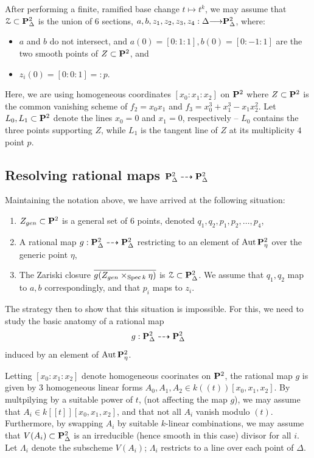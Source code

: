 \documentclass[12pt,reqno]{amsart}
\renewcommand{\k}{k}
\renewcommand{\to}{{\longrightarrow}}
\numberwithin{equation}{section}
\begin{document}
After performing a finite, ramified base change $t \mapsto t^{k}$, we
may assume that $\mathcal{Z} \subset \P^{2}_{\Delta}$ is the union of
$6$ sections,
$a, b, z_{1}, z_{2}, z_{3}, z_{4}: \Delta \to \P^{2}_{\Delta}$, where:
\begin{itemize}
\item $a$ and $b$ do not intersect, and
  $a(0) = [0:1:1], b(0) = [0:-1:1]$ are the two smooth points of
  $Z \subset \P^{2}$, and
\item $z_{i}(0) =[0:0:1] =: p$.
\end{itemize}
Here, we are using homogeneous coordinates $[x_0 :x_1 : x_2]$ on
$\P^{2}$ where $Z \subset \P^{2}$ is the common vanishing scheme of
$f_{2} = x_0 x_1$ and $f_3 = x_0^3+x_1^3-x_1x_2^2$.  Let
$L_{0}, L_{1} \subset \P^{2}$ denote the lines $x_0 = 0$ and $x_1=0$,
respectively -- $L_0$ contains the three points supporting $Z$, while
$L_1$ is the tangent line of $Z$ at its multiplicity $4$ point $p$.


\subsection{Resolving rational maps $\P^{2}_{\Delta} \dashrightarrow \P^{2}_{\Delta}$}
\label{sec:resolv-rati-maps}

Maintaining the notation above, we have arrived at the following
situation:
\begin{enumerate}
\item $Z_{gen} \subset \P^{2}$ is a general set of $6$ points, denoted $q_{1}, q_{2}, p_{1}, p_{2}, \dots, p_{4}$,\\
\item A rational map
  $g : \P^{2}_{\Delta} \dashrightarrow \P^{2}_{\Delta}$ restricting to
  an element of $\Aut \P^{2}_{\eta}$ over the generic point $\eta$, \\
\item The Zariski closure
  $\overline{g(Z_{gen} \times_{\spec \k} \eta)}$ is
  $\mathcal{Z} \subset \P^{2}_{\Delta}$.  We assume that
  $q_{1}, q_{2}$ map to $a,b$ correspondingly, and that $p_{i}$ maps
  to $z_{i}$.
\end{enumerate}

The strategy then to show that this situation is impossible.  For
this, we need to study the basic anatomy of a rational map
\[g: \P^{2}_{\Delta} \dashrightarrow \P^{2}_{\Delta} \] induced by an
element of $\Aut \P^{2}_{\eta}$.

Letting $[x_0 : x_1 : x_2]$ denote homogeneous coorinates on $\P^{2}$,
the rational map $g$ is given by $3$ homogeneous linear forms
$A_0, A_1, A_2 \in \k(\!(t)\!)[x_0,x_{1},x_{2}]$.  By multpilying by a
suitable power of $t$, (not affecting the map $g$), we may assume that
$A_{i} \in \k[\![t]\!][x_0, x_1, x_2]$, and that not all $A_i$ vanish
modulo $(t)$.  Furthermore, by swapping $A_{i}$ by suitable
$\k$-linear combinations, we may assume that
$V(A_{i}) \subset \P^{2}_{\Delta}$ is an irreducible (hence smooth in
this case) divisor for all $i$.  Let $\Lambda_{i}$ denote the
subscheme $V(A_{i})$; $\Lambda_{i}$ restricts to a line over each
point of $\Delta$.
\end{document}
